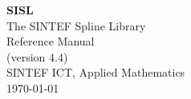 \def \RR{\hbox{\rm I\negthinspace R}}

\pagestyle{headings}
\makeindex


\begin{titlepage}
  \vspace{5 cm}
  \begin{center}
  \Huge
  \textbf{SISL} \\
  \huge
  The SINTEF Spline Library \\ 
  \LARGE
  Reference Manual \\
  (version 4.4)\\ 
  \vspace{10 mm}
  \large
  SINTEF ICT, Applied Mathematics \\
  \today
  \end{center}

\end{titlepage}

\tableofcontents
\cleardoublepage
{}
\setcounter{page}{1}

\cleardoublepage

\cleardoublepage

\cleardoublepage

\cleardoublepage

\cleardoublepage

\cleardoublepage

\cleardoublepage

\cleardoublepage

\cleardoublepage

\cleardoublepage

\cleardoublepage
%
\printindex

